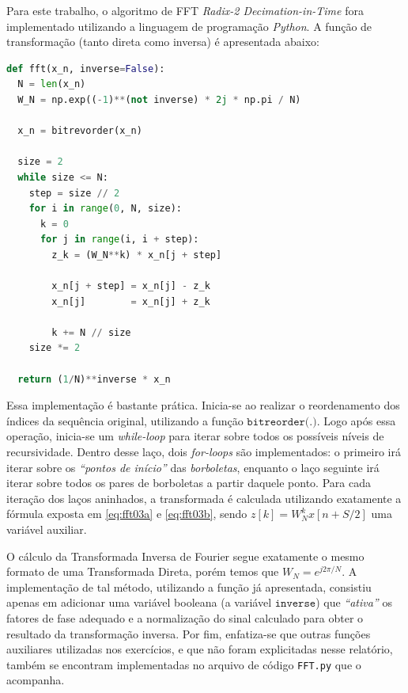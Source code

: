 \documentclass[a4paper,11pt]{article}
\numberwithin{figure}{section}
\numberwithin{equation}{section}
\numberwithin{table}{section}
\theoremstyle{definition}
\begin{document}
Para este trabalho, o algoritmo de FFT \textit{Radix-2 Decimation-in-Time} fora implementado utilizando a linguagem de programação \textit{Python}. A função de transformação (tanto direta como inversa) é apresentada abaixo:

\begin{lstlisting}[language=Python]
def fft(x_n, inverse=False):
  N = len(x_n)
  W_N = np.exp((-1)**(not inverse) * 2j * np.pi / N)

  x_n = bitrevorder(x_n)

  size = 2
  while size <= N:
    step = size // 2
    for i in range(0, N, size):
      k = 0
      for j in range(i, i + step):
        z_k = (W_N**k) * x_n[j + step]

        x_n[j + step] = x_n[j] - z_k
        x_n[j] 	      = x_n[j] + z_k
				
        k += N // size
    size *= 2

  return (1/N)**inverse * x_n
\end{lstlisting}

Essa implementação é bastante prática. Inicia-se ao realizar o reordenamento dos índices da sequência original, utilizando a função $\texttt{bitreorder(.)}$. Logo após essa operação, inicia-se um \textit{while-loop} para iterar sobre todos os possíveis níveis de recursividade. Dentro desse laço, dois \textit{for-loops} são implementados: o primeiro irá iterar sobre os \textit{``pontos de início''} das \textit{borboletas}, enquanto o laço seguinte irá iterar sobre todos os pares de borboletas a partir daquele ponto. Para cada iteração dos laços aninhados, a transformada é calculada utilizando exatamente a fórmula exposta em \eqref{eq:fft03a} e \eqref{eq:fft03b}, sendo $z[k] = W_N^k x[n+S/2]$ uma variável auxiliar.

O cálculo da Transformada Inversa de Fourier segue exatamente o mesmo formato de uma Transformada Direta, porém temos que $W_N = e^{j2\pi/N}$. A implementação de tal método, utilizando a função já apresentada, consistiu apenas em adicionar uma variável booleana (a variável $\texttt{inverse}$) que \textit{``ativa''} os fatores de fase adequado e a normalização do sinal calculado para obter o resultado da transformação inversa. Por fim, enfatiza-se que outras funções auxiliares utilizadas nos exercícios, e que não foram explicitadas nesse relatório, também se encontram implementadas no arquivo de código \texttt{FFT.py} que o acompanha.

\end{document}
